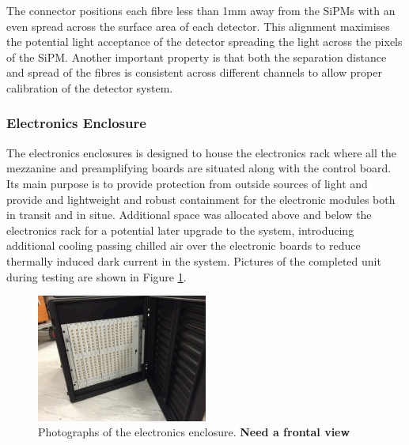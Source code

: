 The connector positions each fibre less than 1mm away from the SiPMs with an even spread across the surface area of each detector. This alignment maximises the potential light acceptance of the detector spreading the light across the pixels of the SiPM. Another important property is that both the separation distance and spread of the fibres is consistent across different channels to allow proper calibration of the detector system.

\subsubsection*{Electronics Enclosure}

The electronics enclosures is designed to house the electronics rack where all the mezzanine and preamplifying boards are situated along with the control board. Its main purpose is to provide protection from outside sources of light and provide and lightweight and robust containment for the electronic modules both in transit and in situe. Additional space was allocated above and below the electronics rack for a potential later upgrade to the system, introducing additional cooling passing chilled air over the electronic boards to reduce thermally induced dark current in the system. Pictures of the completed unit during testing are shown in Figure \ref{Electronics Enclosure}.

\begin{figure}[!ht]
	\centering
	\includegraphics[width=0.5\textwidth]{ImgChap1/board}
	\caption{Photographs of the electronics enclosure. \textbf{Need a frontal view}}
	\label{Electronics Enclosure}
\end{figure}


